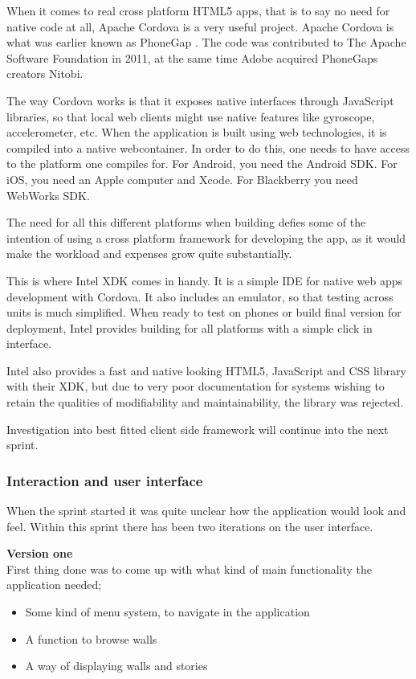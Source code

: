 \documentclass[11pt]{book}
\begin{document}
When it comes to real cross platform HTML5 apps, that is to say no need for native code at all, Apache Cordova is a very useful project. Apache Cordova is what was earlier known as PhoneGap \cite{phonegap}. The code was contributed to The Apache Software Foundation in 2011, at the same time Adobe acquired PhoneGaps creators Nitobi.

The way Cordova works is that it exposes native interfaces through JavaScript libraries, so that local web clients might use native features like gyroscope, accelerometer, etc. When the application is built using web technologies, it is compiled into a native webcontainer. In order to do this, one needs to have access to the platform one compiles for. For Android, you need the Android SDK. For iOS, you need an Apple computer and Xcode. For Blackberry you need WebWorks SDK.

The need for all this different platforms when building defies some of the intention of using a cross platform framework for developing the app, as it would make the workload and expenses grow quite substantially.

This is where Intel XDK comes in handy. It is a simple IDE for native web apps development with Cordova. It also includes an emulator, so that testing across units is much simplified. When ready to test on phones or build final version for deployment, Intel provides building for all platforms with a simple click in interface.

Intel also provides a fast and native looking HTML5, JavaScript and CSS library with their XDK, but due to very poor documentation for systems wishing to retain the qualities of modifiability and maintainability, the library was rejected.

Investigation into best fitted client side framework will continue into the next sprint.

\subsubsection{Interaction and user interface}
When the sprint started it was quite unclear how the application would look and feel. Within this sprint there has been two iterations on the user interface.

\textbf{Version one}\\
First thing done was to come up with what kind of main functionality the application needed;

\begin{itemize}
    \item Some kind of menu system, to navigate in the application
    \item A function to browse walls
    \item A way of displaying walls and stories
\end{itemize}
\end{document}
